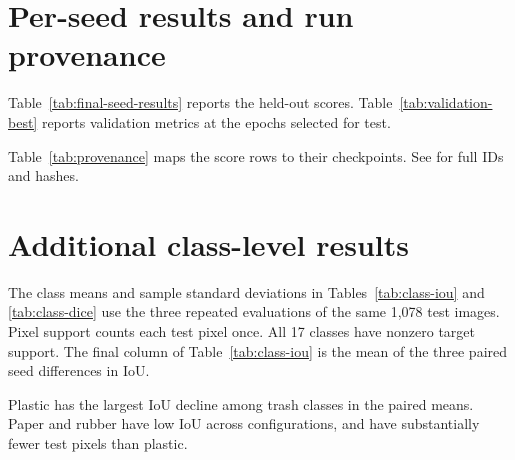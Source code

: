 \clearpage
\section{Per-seed results and run provenance}
\label{app:runs}
\begingroup
{}
\setlength{\intextsep}{7pt}
Table~\ref{tab:final-seed-results} reports the held-out scores. Table~\ref{tab:validation-best} reports validation metrics at the epochs selected for test.

\begin{table}[H]\centering\small
\caption{Selected validation checkpoints. The three overlap columns are percentages.}\label{tab:validation-best}

\end{table}

Table~\ref{tab:provenance} maps the score rows to their checkpoints. See  for full IDs and hashes.
\begin{table}[H]\centering\small
\caption{Active run identifier and evaluated checkpoint fingerprint for each result.}\label{tab:provenance}

\end{table}

\begin{table}[H]\centering\small
\caption{S1 minus S0 validation deltas in percentage points and outcome of the proposal rule. The held-out deltas appear separately in Table~\ref{tab:final-paired-deltas}.}\label{tab:validation-deltas}

\end{table}
\endgroup

\clearpage
\section{Additional class-level results}
\label{app:class}
The class means and sample standard deviations in Tables~\ref{tab:class-iou} and \ref{tab:class-dice} use the three repeated evaluations of the same 1,078 test images. Pixel support counts each test pixel once. All 17 classes have nonzero target support. The final column of Table~\ref{tab:class-iou} is the mean of the three paired seed differences in IoU.

\begin{table}[H]\centering\footnotesize
\caption{Held-out per-class IoU, mean $\pm$ sample SD (\%). S1--S0 is in percentage points.}\label{tab:class-iou}

\end{table}
Plastic has the largest IoU decline among trash classes in the paired means. Paper and rubber have low IoU across configurations, and have substantially fewer test pixels than plastic.

